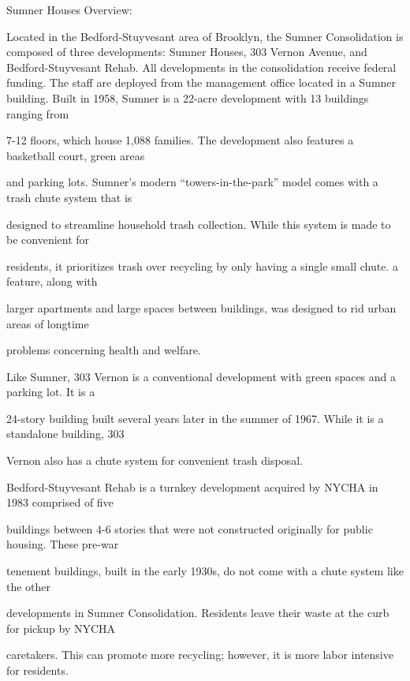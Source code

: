 Sumner Houses Overview:



																																																									Located in the Bedford-Stuyvesant area of Brooklyn, the Sumner Consolidation is composed of three developments: Sumner Houses, 303 Vernon Avenue, and Bedford-Stuyvesant Rehab. All developments in the consolidation 	receive federal funding. The staff are deployed from the management office located in a Sumner building. Built in 1958, Sumner is a 22-acre development with 13 buildings ranging from

																																																									7-12 floors, which house 1,088 families. The development also features a basketball court, green areas

																																																									and parking lots. Sumner's modern ``towers-in-the-park'' model comes with a trash chute system that is

																																																									designed to streamline household trash collection. While this system is made to be convenient for

																																																									residents, it prioritizes trash over recycling by only having a single small chute. a feature, along with

																																																									larger apartments and large spaces between buildings, was designed to rid urban areas of longtime

																																																									problems concerning health and welfare.

																																																									Like Sumner, 303 Vernon is a conventional development with green spaces and a parking lot. It is a

																																																									24-story building built several years later in the summer of 1967. While it is a standalone building, 303

																																																									Vernon also has a chute system for convenient trash disposal.

																																																									Bedford-Stuyvesant Rehab is a turnkey development acquired by NYCHA in 1983 comprised of five

																																																									buildings between 4-6 stories that were not constructed originally for public housing. These pre-war

																																																									tenement buildings, built in the early 1930s, do not come with a chute system like the other

																																																									developments in Sumner Consolidation. Residents leave their waste at the curb for pickup by NYCHA

	caretakers. This can promote more recycling; however, it is more labor intensive for residents.
